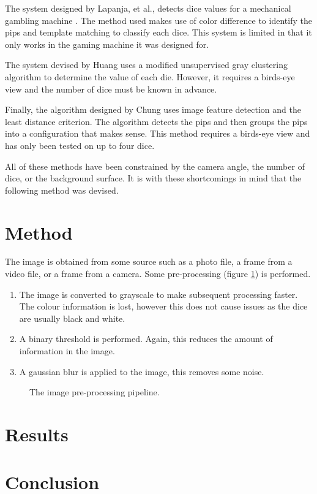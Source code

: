 \documentclass[conference]{IEEEtran}
\begin{document}
The system designed by Lapanja, et al., detects dice values for a mechanical gambling machine \cite{Lapanjaa}.
The method used makes use of color difference to identify the pips and template matching to classify each dice.
This system is limited in that it only works in the gaming machine it was designed for.

The system devised by Huang \cite{Huang2008} uses a modified unsupervised gray clustering algorithm to determine the value of each die.
However, it requires a birds-eye view and the number of dice must be known in advance.

Finally, the algorithm designed by Chung \cite{Chung2009} uses image feature detection and the least distance criterion.
The algorithm detects the pips and then groups the pips into a configuration that makes sense.
This method requires a birds-eye view and has only been tested on up to four dice.

All of these methods have been constrained by the camera angle, the number of dice, or the background surface.
It is with these shortcomings in mind that the following method was devised.

\section{Method}

The image is obtained from some source such as a photo file, a frame from a video file, or a frame from a camera.
Some pre-processing (figure \ref{fig:pre-processing}) is performed.
\begin{enumerate}
	\item The image is converted to grayscale to make subsequent processing faster. The colour information is lost, however this does not cause issues as the dice are usually black and white.
	\item A binary threshold is performed. Again, this reduces the amount of information in the image.
	\item A gaussian blur is applied to the image, this removes some noise.
\end{enumerate}
\begin{figure}
	\centering
	\caption{The image pre-processing pipeline.}
	\label{fig:pre-processing}
\end{figure}

\section{Results}

\section{Conclusion}

\printbibliography
\end{document}
